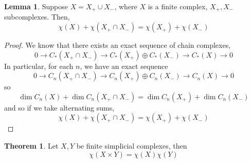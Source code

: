 \documentclass[a4paper,14pt]{extarticle}
\theoremstyle{definition}
\newtheorem*{theorem}{Theorem}
\newtheorem*{lemma}{Lemma}
\begin{document}
\begin{lemma}
	Suppose $X=X_+\cup X_-$, where $X$ is a finite complex, $X_+,X_-$ subcomplexes. Then,
	\[\chi(X)+\chi(X_+\cap X_-)=\chi(X_+)+\chi(X_-)\]
\end{lemma}

\begin{proof}
	We know that there exists an exact sequence of chain complexes,
	\[0\rightarrow C_*(X_+\cap X_-)\rightarrow C_*(X_+)\oplus C_*(X_-)\rightarrow C_*(X)
	\rightarrow 0\] In particular, for each $n$, we have an exact sequence 
	\[0\rightarrow C_n(X_+\cap X_-)\rightarrow C_n(X_+)\oplus C_n(X_-)\rightarrow C_n(X)
	\rightarrow 0\]
	so \[\dim C_n(X) + \dim C_n(X_+\cap X_-)=\dim C_n(X_+)+\dim C_n (X_-)\] and so if 
	we take alternating sums, 
	\[\chi(X)+\chi(X_+\cap X_-)=\chi(X_+)+\chi(X_-)\]
\end{proof}

\begin{theorem}
	Let $X,Y$ be finite simplicial complexes, then 
	\[\chi(X\times Y)=\chi(X)\chi(Y)\]
\end{theorem}
\end{document}
